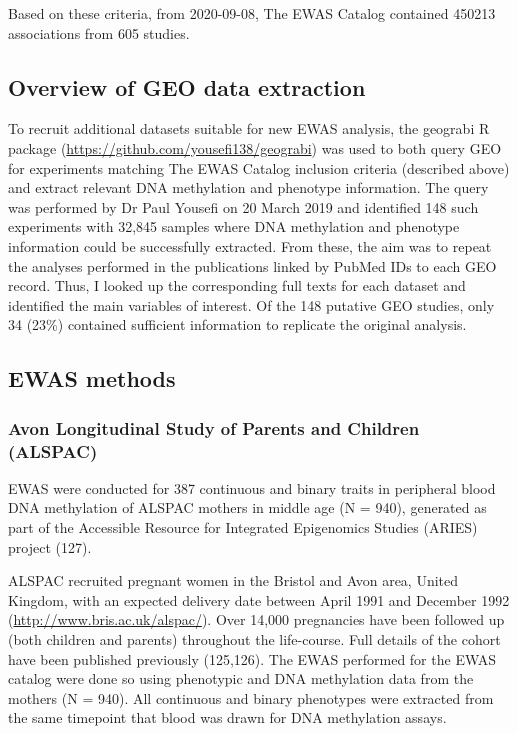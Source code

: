 \documentclass[11pt,oneside]{bristolthesis}
\begin{document}
Based on these criteria, from 2020-09-08, The EWAS Catalog contained 450213 associations from 605 studies.

\hypertarget{overview-of-geo-data-extraction}{%
\subsection{Overview of GEO data extraction}\label{overview-of-geo-data-extraction}}

To recruit additional datasets suitable for new EWAS analysis, the geograbi R package (\url{https://github.com/yousefi138/geograbi}) was used to both query GEO for experiments matching The EWAS Catalog inclusion criteria (described above) and extract relevant DNA methylation and phenotype information. The query was performed by Dr Paul Yousefi on 20 March 2019 and identified 148 such experiments with 32,845 samples where DNA methylation and phenotype information could be successfully extracted. From these, the aim was to repeat the analyses performed in the publications linked by PubMed IDs to each GEO record. Thus, I looked up the corresponding full texts for each dataset and identified the main variables of interest. Of the 148 putative GEO studies, only 34 (23\%) contained sufficient information to replicate the original analysis.

\hypertarget{ewas-methods-03}{%
\subsection{EWAS methods}\label{ewas-methods-03}}

\hypertarget{alspac-03}{%
\subsubsection{Avon Longitudinal Study of Parents and Children (ALSPAC)}\label{alspac-03}}

EWAS were conducted for 387 continuous and binary traits in peripheral blood DNA methylation of ALSPAC mothers in middle age (N = 940), generated as part of the Accessible Resource for Integrated Epigenomics Studies (ARIES) project (127).

ALSPAC recruited pregnant women in the Bristol and Avon area, United Kingdom, with an expected delivery date between April 1991 and December 1992 (\url{http://www.bris.ac.uk/alspac/}). Over 14,000 pregnancies have been followed up (both children and parents) throughout the life-course. Full details of the cohort have been published previously (125,126). The EWAS performed for the EWAS catalog were done so using phenotypic and DNA methylation data from the mothers (N = 940).
All continuous and binary phenotypes were extracted from the same timepoint that blood was drawn for DNA methylation assays.
\end{document}
